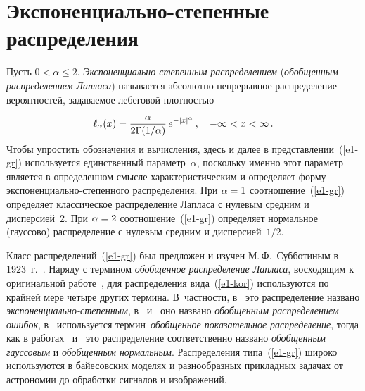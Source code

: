 

      \thispagestyle{headings}

      \begin{multicols}{2}

            \label{st\stat}


\section{Экспоненциально-степенные распределения}

Пусть $0<\alpha\leqslant 2$. \textit{Экс\-по\-нен\-ци\-аль\-но-сте\-пен\-ным распределением} 
(\textit{обобщенным рас\-пре\-де\-лением Лапласа}) называется абсолютно 
непрерывное распределение вероятностей, задаваемое лебеговой плот\-ностью
\begin{equation}
\ell_{\alpha}(x)=\displaystyle\frac{\displaystyle \alpha\mathstrut}{\displaystyle 2\Gamma({1}/{\alpha})\mathstrut} \,
e^{-|x|^{\alpha}}\,,\ \ \ -\infty< x<\infty\,.\label{e1-gr}
\end{equation}
Чтобы упростить обозначения и вычисления, здесь и далее в
представлении~(\ref{e1-gr}) используется единственный параметр~$\alpha$,
поскольку именно этот \mbox{параметр} является в определенном смысле
характеристическим и определяет форму экс\-по\-нен\-ци\-ально-сте\-пен\-но\-го
распределения. При $\alpha\hm=1$ соотноше\-ние~(\ref{e1-gr}) определяет
классическое распределение Лапласа с нулевым средним и дисперсией~2.
При $\alpha\hm=2$ соотношение~(\ref{e1-gr}) определяет нормальное (гауссово)
распределение с нулевым средним и дисперсией~$1/2$.
\columnbreak

Класс распределений~(\ref{e1-gr}) был предложен и \mbox{изучен} М.\,Ф.~Субботиным в
1923~г.~\cite{Subbotin1923}. Наряду с термином \textit{обобщенное
распределение Лапласа}, восходящим к оригинальной работе~\cite{Subbotin1923}, 
для распределения вида~(\ref{e1-kor}) используются по
крайней мере четыре других термина. В~частности, в~\cite{BoxTiao1973} 
это распределение названо \textit{экс\-по\-нен\-ци\-аль\-но-сте\-пен\-ным}, в~\cite{Evans2000} 
и~\cite{LeemisMcQueston2008} оно названо \textit{обобщенным
распределением ошибок}, в~\cite{Morgan1996} используется 
термин~\textit{обобщенное показательное распределение}, тогда как в работах~\cite{Varanasi1989} 
и~\cite{Nadaraja2005} это распределение
соответственно названо \textit{обобщенным гауссовым} и \textit{обобщенным
нормальным}. Распределения типа~(\ref{e1-gr}) широко используются в
байесовских моделях и разнообразных прикладных задачах от астрономии
до обработки сигналов и изображений.


\end{multicols}
